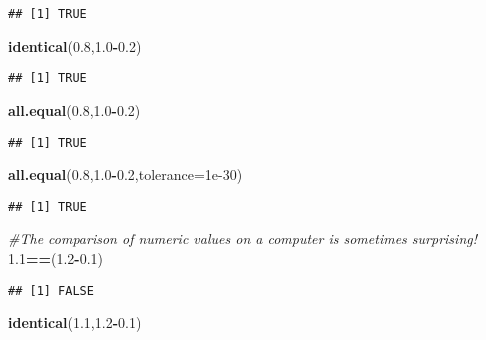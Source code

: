 \documentclass[]{book}
\newenvironment{Shaded}{\begin{snugshade}}{\end{snugshade}}
\newcommand{\KeywordTok}[1]{\textcolor[rgb]{0.13,0.29,0.53}{\textbf{#1}}}
\newcommand{\DataTypeTok}[1]{\textcolor[rgb]{0.13,0.29,0.53}{#1}}
\newcommand{\FloatTok}[1]{\textcolor[rgb]{0.00,0.00,0.81}{#1}}
\newcommand{\CommentTok}[1]{\textcolor[rgb]{0.56,0.35,0.01}{\textit{#1}}}
\newcommand{\OperatorTok}[1]{\textcolor[rgb]{0.81,0.36,0.00}{\textbf{#1}}}
\newcommand{\NormalTok}[1]{#1}
\theoremstyle{definition}
\theoremstyle{definition}
\theoremstyle{definition}
\theoremstyle{remark}
\begin{document}
\begin{verbatim}
## [1] TRUE
\end{verbatim}

\begin{Shaded}
\begin{Highlighting}[]
\KeywordTok{identical}\NormalTok{(}\FloatTok{0.8}\NormalTok{,}\FloatTok{1.0}\OperatorTok{-}\FloatTok{0.2}\NormalTok{)}
\end{Highlighting}
\end{Shaded}

\begin{verbatim}
## [1] TRUE
\end{verbatim}

\begin{Shaded}
\begin{Highlighting}[]
\KeywordTok{all.equal}\NormalTok{(}\FloatTok{0.8}\NormalTok{,}\FloatTok{1.0}\OperatorTok{-}\FloatTok{0.2}\NormalTok{)}
\end{Highlighting}
\end{Shaded}

\begin{verbatim}
## [1] TRUE
\end{verbatim}

\begin{Shaded}
\begin{Highlighting}[]
\KeywordTok{all.equal}\NormalTok{(}\FloatTok{0.8}\NormalTok{,}\FloatTok{1.0}\OperatorTok{-}\FloatTok{0.2}\NormalTok{,}\DataTypeTok{tolerance=}\FloatTok{1e-30}\NormalTok{)}
\end{Highlighting}
\end{Shaded}

\begin{verbatim}
## [1] TRUE
\end{verbatim}

\begin{Shaded}
\begin{Highlighting}[]
\CommentTok{#The comparison of numeric values on a computer is sometimes surprising!}
\FloatTok{1.1}\OperatorTok{==}\NormalTok{(}\FloatTok{1.2}\OperatorTok{-}\FloatTok{0.1}\NormalTok{)}
\end{Highlighting}
\end{Shaded}

\begin{verbatim}
## [1] FALSE
\end{verbatim}

\begin{Shaded}
\begin{Highlighting}[]
\KeywordTok{identical}\NormalTok{(}\FloatTok{1.1}\NormalTok{,}\FloatTok{1.2}\OperatorTok{-}\FloatTok{0.1}\NormalTok{)}
\end{Highlighting}
\end{Shaded}
\end{document}
